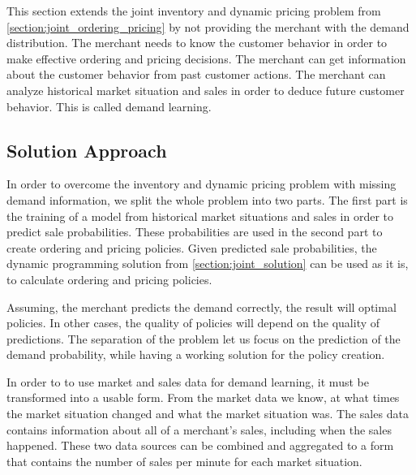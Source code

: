 This section extends the joint inventory and dynamic pricing problem from \cref{section:joint_ordering_pricing} by not providing the merchant with the demand distribution.
The merchant needs to know the customer behavior in order to make effective ordering and pricing decisions.
The merchant can get information about the customer behavior from past customer actions.
The merchant can analyze historical market situation and sales in order to deduce future customer behavior.
This is called demand learning.



\subsection{Solution Approach}
In order to overcome the inventory and dynamic pricing problem with missing demand information, we split the whole problem into two parts.
The first part is the training of a model from historical market situations and sales in order to predict sale probabilities.
These probabilities are used in the second part to create ordering and pricing policies.
Given predicted sale probabilities, the dynamic programming solution from \cref{section:joint_solution} can be used as it is, to calculate ordering and pricing policies.

Assuming, the merchant predicts the demand correctly, the result will optimal policies.
In other cases, the quality of policies will depend on the quality of predictions. 
The separation of the problem let us focus on the prediction of the demand probability, while having a working solution for the policy creation.

In order to to use market and sales data for demand learning, it must be transformed into a usable form.
From the market data we know, at what times the market situation changed and what the market situation was.
The sales data contains information about all of a merchant's sales, including when the sales happened.
These two data sources can be combined and aggregated to a form that contains the number of sales per minute for each market situation.

